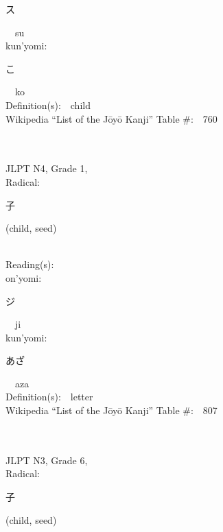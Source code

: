 \begin{multicols}{2}
{\hspace*{2em}}{\begin{CJK}{UTF8}{min} ス \end{CJK}}\ \ su\ \ \\
{\hspace*{1em}}kun'yomi:\ \ \\
{\hspace*{2em}}{\begin{CJK}{UTF8}{min} こ \end{CJK}}\ \ ko\ \ \\
Definition(s):\ \ child \\
Wikipedia ``List of the J\=oy\=o Kanji'' Table \#:\ \ 760 \\
\ \ \\
{\fontsize{34pt}{40pt}  }\ \ \\  %
{JLPT N4, Grade 1, \\Radical:\ \ {\begin{CJK}{UTF8}{min} 子 \end{CJK}} (child, seed) } \\
Reading(s):\ \ \\
{\hspace*{1em}}on'yomi:\ \ \\
{\hspace*{2em}}{\begin{CJK}{UTF8}{min} ジ \end{CJK}}\ \ ji\ \ \\
{\hspace*{1em}}kun'yomi:\ \ \\
{\hspace*{2em}}{\begin{CJK}{UTF8}{min} あざ \end{CJK}}\ \ aza\ \ \\
Definition(s):\ \ letter \\
Wikipedia ``List of the J\=oy\=o Kanji'' Table \#:\ \ 807 \\
\ \ \\
{\fontsize{34pt}{40pt}  }\ \ \\  %
{JLPT N3, Grade 6, \\Radical:\ \ {\begin{CJK}{UTF8}{min} 子 \end{CJK}} (child, seed) } \\

\end{multicols}
